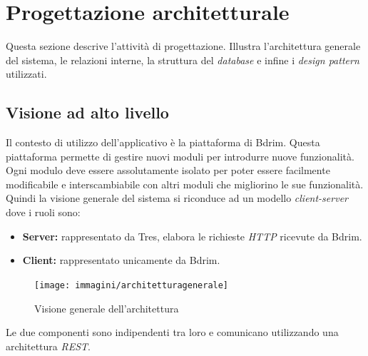 \newpage
\section{Progettazione architetturale}
Questa sezione descrive l'attività di progettazione. Illustra l'architettura generale del sistema, le relazioni interne, la struttura del \emph{database} e infine i \emph{design pattern} utilizzati.
\subsection{Visione ad alto livello}
Il contesto di utilizzo dell'applicativo è la piattaforma di Bdrim. Questa piattaforma permette di gestire nuovi moduli per introdurre nuove funzionalità. Ogni modulo deve essere assolutamente isolato per poter essere facilmente modificabile e interscambiabile con altri moduli che migliorino le sue funzionalità. Quindi la visione generale del sistema si riconduce ad un modello \emph{client-server} dove i ruoli sono:
\begin{itemize}
\item \textbf{Server:} rappresentato da Tres, elabora le richieste \emph{HTTP} ricevute da Bdrim.
\item \textbf{Client:} rappresentato unicamente da Bdrim.
\end{itemize}
\begin{figure}[h]
\centering
\texttt{[image: immagini/architetturagenerale]}
\caption{Visione generale dell'architettura}
\label{fig:arch-gen}
\end{figure}
Le due componenti sono indipendenti tra loro e comunicano utilizzando una architettura \emph{REST}.
\newpage
